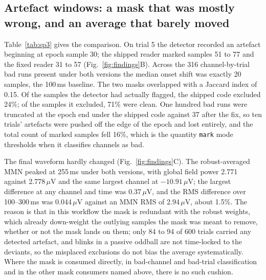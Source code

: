 \documentclass[11pt]{article}
\newcommand{\code}[1]{\texttt{#1}}
\begin{document}
\subsection{Artefact windows: a mask that was mostly wrong, and an average that barely moved}
Table~\ref{tab:sp3} gives the comparison. On trial 5 the detector recorded an artefact beginning at epoch sample 30; the shipped reader marked samples 51 to 77 and the fixed reader 31 to 57 (Fig.~\ref{fig:findings}B). Across the 316 channel-by-trial bad runs present under both versions the median onset shift was exactly 20 samples, the 100\,ms baseline. The two masks overlapped with a Jaccard index of 0.15. Of the samples the detector had actually flagged, the shipped code excluded 24\%; of the samples it excluded, 71\% were clean. One hundred bad runs were truncated at the epoch end under the shipped code against 37 after the fix, so ten trials' artefacts were pushed off the edge of the epoch and lost entirely, and the total count of marked samples fell 16\%, which is the quantity \code{mark} mode thresholds when it classifies channels as bad.

The final waveform hardly changed (Fig.~\ref{fig:findings}C). The robust-averaged MMN peaked at 255\,ms under both versions, with global field power 2.771 against 2.778\,$\mu$V and the same largest channel at $-10.91\,\mu$V; the largest difference at any channel and time was 0.37\,$\mu$V, and the RMS difference over 100--300\,ms was 0.044\,$\mu$V against an MMN RMS of 2.94\,$\mu$V, about 1.5\%. The reason is that in this workflow the mask is redundant with the robust weights, which already down-weight the outlying samples the mask was meant to remove, whether or not the mask lands on them; only 84 to 94 of 600 trials carried any detected artefact, and blinks in a passive oddball are not time-locked to the deviants, so the misplaced exclusions do not bias the average systematically. Where the mask is consumed directly, in bad-channel and bad-trial classification and in the other mask consumers named above, there is no such cushion.
\end{document}
